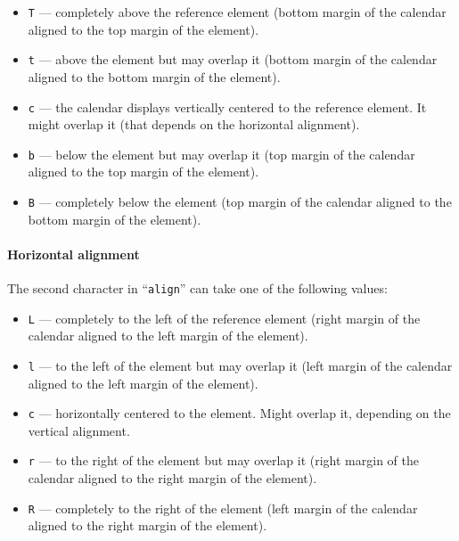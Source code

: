 \documentclass[a4paper,10pt]{article}
\begin{document}
\begin{itemize}

\item \texttt{T} --- completely above the reference element (bottom margin of
the calendar aligned to the top margin of the element).

\item \texttt{t} --- above the element but may overlap it (bottom margin of the calendar aligned to
the bottom margin of the element).

\item \texttt{c} --- the calendar displays vertically centered to the reference
element.  It might overlap it (that depends on the horizontal alignment).

\item \texttt{b} --- below the element but may overlap it (top margin of the calendar aligned to
the top margin of the element).

\item \texttt{B} --- completely below the element (top margin of the calendar
aligned to the bottom margin of the element).

\end{itemize}

\paragraph{Horizontal alignment}
The second character in ``\texttt{align}'' can take one of the following values:

\begin{itemize}

\item \texttt{L} --- completely to the left of the reference element (right
margin of the calendar aligned to the left margin of the element).

\item \texttt{l} --- to the left of the element but may overlap it (left margin
of the calendar aligned to the left margin of the element).

\item \texttt{c} --- horizontally centered to the element.  Might overlap it,
depending on the vertical alignment.

\item \texttt{r} --- to the right of the element but may overlap it (right
margin of the calendar aligned to the right margin of the element).

\item \texttt{R} --- completely to the right of the element (left margin of the
calendar aligned to the right margin of the element).

\end{itemize}
\end{document}
